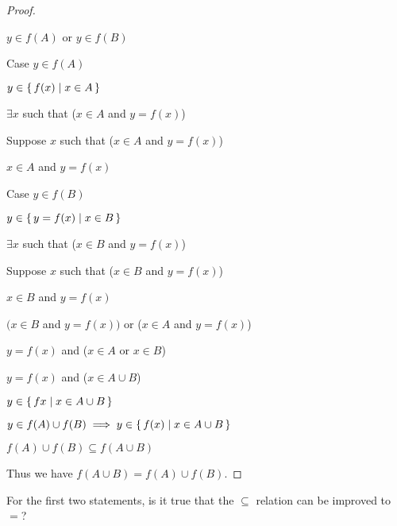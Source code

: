 \documentclass[../../main.tex]{subfiles}
\begin{document}
\begin{q}
\begin{enumerate}
\begin{proof}
\begin{linebyline}
                \item $y \in f(A)$ or $y \in f(B)$
                \item Case $y \in f(A)$
                \begin{linebyline}
                    \item $y \in \{\,f(x)\mid x \in A\,\}$ 
                    \item $\exists x$ such that ($x \in A$ and $y=f(x)$)
                    \item Suppose $x$ such that ($x \in A$ and $y=f(x)$) 
                    \begin{linebyline}
                        \item $x \in A$ and $y=f(x)$
                    \end{linebyline}
                \end{linebyline}
                \item Case $y \in f(B)$
                \begin{linebyline}
                    \item $y \in \{\,y=f(x)\mid x \in B\,\}$
                    \item $\exists x$ such that ($x \in B$ and $y=f(x)$)
                    \item Suppose $x$ such that ($x \in B$ and $y=f(x)$)
                    \begin{linebyline}
                        \item $x \in B$ and $y=f(x)$
                    \end{linebyline}
                \end{linebyline}
                \item $(x \in B$ and $y=f(x))$ or ($x \in A$ and $y=f(x)$) 
                \item $y=f(x)$ and ($x \in A$ or $x \in B$) 
                \item $y=f(x)$ and ($x \in A \cup B$)
                \item $y \in \{\,f{x}\mid x \in A \cup B\,\}$
                \item $y \in f(A) \cup f(B) \implies y \in \{\,f(x)\mid x \in A \cup B\,\}$
                \item $f(A) \cup f(B) \subseteq f(A \cup B)$
            \end{linebyline}
            Thus we have $f(A \cup B) = f(A) \cup f(B)$.
        \end{proof}
        
    \end{enumerate}
    For the first two statements, is it true that the $\subseteq$ relation can be improved to $=$?


\end{q}
\end{document}
